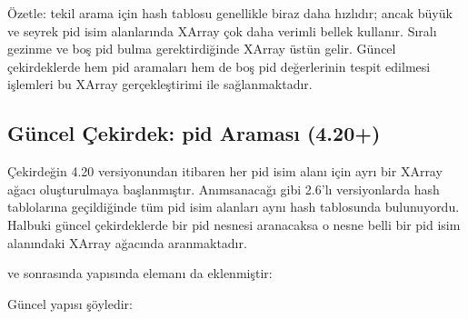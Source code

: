 \documentclass[a4paper,10pt,turkish]{sphinxmanual}
\begin{document}
\sphinxAtStartPar
Özetle: tekil arama için hash tablosu genellikle biraz daha hızlıdır; ancak büyük ve seyrek pid isim
alanlarında XArray çok daha verimli bellek kullanır. Sıralı gezinme ve boş pid bulma gerektirdiğinde
XArray üstün gelir. Güncel çekirdeklerde hem pid aramaları hem de boş pid değerlerinin tespit edilmesi
işlemleri bu XArray gerçekleştirimi ile sağlanmaktadır.


\subsection{Güncel Çekirdek: pid Araması (4.20+)}
\label{\detokenize{processcontrolblock:guncel-cekirdek-pid-aramasi-4-20}}
\sphinxAtStartPar
Çekirdeğin 4.20 versiyonundan itibaren her pid isim alanı için ayrı bir XArray ağacı oluşturulmaya
başlanmıştır. Anımsanacağı gibi 2.6’lı versiyonlarda hash tablolarına geçildiğinde tüm pid isim alanları
aynı hash tablosunda bulunuyordu. Halbuki güncel çekirdeklerde bir pid nesnesi aranacaksa o nesne belli
bir pid isim alanındaki XArray ağacında aranmaktadır.

 ve sonrasında  yapısında  elemanı da eklenmiştir:

\begin{sphinxVerbatim}[commandchars=\\\{\}]
\end{sphinxVerbatim}

\sphinxAtStartPar
Güncel  yapısı şöyledir:
\end{document}
